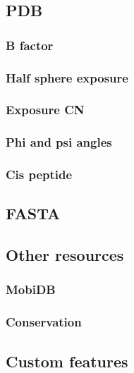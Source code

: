 \subsection{PDB}

\subsubsection{B factor}

\subsubsection{Half sphere exposure}

\subsubsection{Exposure CN}

\subsubsection{Phi and psi angles}

\subsubsection{Cis peptide}




\subsection{FASTA}



\subsection{Other resources}

\subsubsection{MobiDB}

\subsubsection{Conservation}


\subsection{Custom features}




